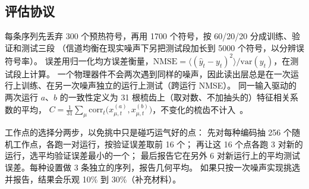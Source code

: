 \subsection{评估协议}\label{sec:protocol}

每条序列先丢弃 300 个预热符号，再用 1700 个符号，按 60/20/20 分成训练、验证和测试三段
（信道均衡在现实噪声下另把测试段加长到 5000 个符号，以分辨误符号率）。
误差用归一化均方误差衡量，$\mathrm{NMSE}=\langle(\hat y_t-y_t)^2\rangle/\mathrm{var}(y_t)$，在测试段上计算。
一个物理器件不会两次遇到同样的噪声，因此读出层总是在一次运行上训练、在另一次噪声独立的运行上测试（跨运行 NMSE）。
同一输入驱动的两次运行 $a$、$b$ 的一致性定义为 31 根梳齿上（取对数、不加抽头的）特征相关系数的平均，
$C=\frac{1}{31}\sum_\mu\mathrm{corr}_t\big(x^{(a)}_{\mu,t},x^{(b)}_{\mu,t}\big)$，不变化的梳齿不计入~\cite{uchida2004}。

工作点的选择分两步，以免挑中只是碰巧运气好的点：
先对每种编码抽 256 个随机工作点，各跑一对运行，按验证误差取前 16 个；
再让这 16 个点各跑 3 对新的运行，选平均验证误差最小的一个；
最后报告它在另外 6 对新运行上的平均测试误差。每种设置做 3 条独立的序列，报告几何平均。
如果只按一次噪声实现挑选并报告，结果会乐观 10\% 到 30\%（补充材料）。
